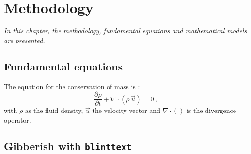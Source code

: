 
\chapter{Methodology}
\label{chap:method}

\textit{
In this chapter, the methodology,
fundamental equations and mathematical models
are presented.
}


\section{Fundamental equations}
\label{sec:equations}

The equation for the conservation of mass is \citep{Schlichting-book-2000}:
\begin{equation}
\frac{\partial \rho}{\partial t} + \nabla\cdot\left(\rho\,\vec{u}\right) = 0
\,,
\label{eq:continuity}
\end{equation}
\noindent
with
$\rho$ as the fluid density,
$\vec{u}$ the velocity vector
and $\nabla\cdot\left(\right)$ is the divergence operator.


\section{Gibberish with \texttt{blinttext}}

\blindtext
\blinditemize
\blindtext
\blindenumerate
\blindtext
\blinddescription
\Blindtext


